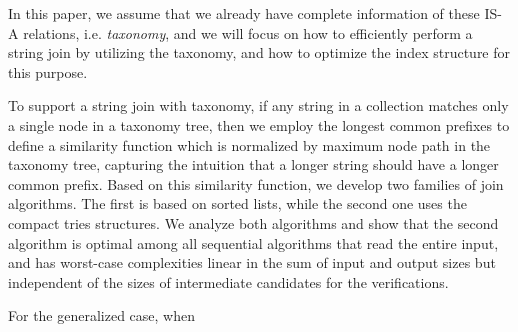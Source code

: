 In this paper, we assume that we already have complete
information of these IS-A relations, i.e. \textit{taxonomy}, and we will focus on how
to efficiently perform a string join by utilizing the taxonomy, and how to optimize the index structure
for this purpose.



To support a string join with taxonomy, if any string in a collection matches only a single node in a taxonomy tree, then we employ the longest common prefixes  to define a similarity function which is normalized by maximum node path in the taxonomy tree, capturing the intuition that a longer string should have a longer common prefix. Based on this similarity function, we develop two families of join algorithms. The first is based on sorted lists, while the second one uses the compact tries structures. We analyze both algorithms and show that the second algorithm is optimal among all sequential algorithms that read the entire input, and has worst-case complexities linear in the sum of input and output sizes but independent of the sizes of intermediate candidates for the verifications.





For the generalized case, when

